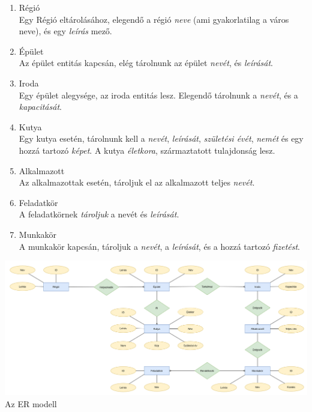 \documentclass[a4paper,12pt]{article}
\begin{document}
\begin{enumerate}
	\item Régió \\
	Egy Régió eltárolásához, elegendő a régió \textit{neve} (ami gyakorlatilag a város neve), és egy \textit{leírás} mező.
	
	\item Épület \\
	Az épület entitás kapcsán, elég tárolnunk az épület \textit{nevét}, és \textit{leírását}.
	
	\item Iroda \\
	Egy épület alegysége, az iroda entitás lesz. Elegendő tárolnunk a \textit{nevét}, és a \textit{kapacitását}.
	
	\item Kutya \\
	Egy kutya esetén, tárolnunk kell a \textit{nevét}, \textit{leírását}, \textit{születési évét}, \textit{nemét} és egy hozzá tartozó \textit{képet}. A kutya \textit{életkora}, származtatott tulajdonság lesz.
	
	\item Alkalmazott \\
	Az alkalmazottak esetén, tároljuk el az alkalmazott teljes \textit{nevét}.
	
	\item Feladatkör \\
	A feladatkörnek \textit{tároljuk} a nevét és \textit{leírását}.
	
	\item Munkakör \\
	A munkakör kapcsán, tároljuk a \textit{nevét}, a \textit{leírását}, és a hozzá tartozó \textit{fizetést}.
\end{enumerate}

\begin{center}
	\includegraphics[width = 17cm]{"draw_io/SQL_tervezés.png"} \\
	{\small Az ER modell}
\end{center}
\end{document}

